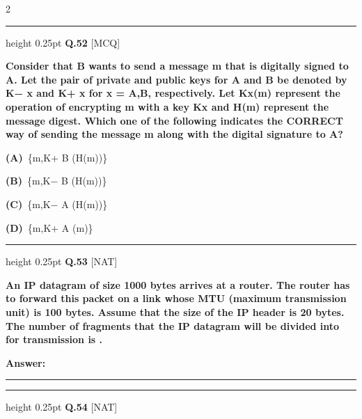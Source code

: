 \documentclass[a4paper,10pt,twoside]{article}
\begin{document}
\begin{multicols}{2}
\par\vspace{6pt}\hrule height 0.25pt\vspace{6pt}
\noindent\textbf{Q.52} \hfill {\footnotesize\textsf{[MCQ]}}
\par\vspace{2pt}
{\bfseries Consider that B wants to send a message m that is digitally signed to A. Let the pair of private
and public keys for A and B be denoted by K−
x and K+
x for x = A,B, respectively. Let Kx(m)
represent the operation of encrypting m with a key Kx and H(m) represent the message digest.
Which one of the following indicates the CORRECT way of sending the message m along
with the digital signature to A? \par}
\par\vspace{2pt}\noindent
\textbf{(A)}~\{m,K+ \newline B (H(m))\}\par\vspace{2pt}\noindent
\textbf{(B)}~\{m,K− \newline B (H(m))\}\par\vspace{2pt}\noindent
\textbf{(C)}~\{m,K− \newline A (H(m))\}\par\vspace{2pt}\noindent
\textbf{(D)}~\{m,K+ \newline A (m)\}
\par\vspace{6pt}\hrule height 0.25pt\vspace{6pt}
\noindent\textbf{Q.53} \hfill {\footnotesize\textsf{[NAT]}}
\par\vspace{2pt}
{\bfseries An IP datagram of size 1000 bytes arrives at a router. The router has to forward this packet on
a link whose MTU (maximum transmission unit) is 100 bytes. Assume that the size of the IP
header is 20 bytes.
The number of fragments that the IP datagram will be divided into for transmission is
. \par}
\par\vspace{3pt}\noindent\textbf{Answer:} \rule{3.2cm}{0.4pt}
\par\vspace{6pt}\hrule height 0.25pt\vspace{6pt}
\noindent\textbf{Q.54} \hfill {\footnotesize\textsf{[NAT]}}
\par\vspace{2pt}

\end{multicols}
\end{document}
